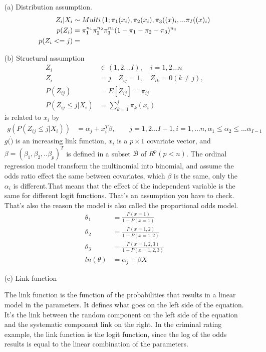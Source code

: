 \documentclass{article}
\begin{document}
\begin{itemize}
\item[(a)] Distribution assumption.
    \begin{align*}
 	Z_i| X_i & \sim Multi\left(1; \pi_1 (\mathnormal{x}_i), \pi_2(\mathnormal {x}_i), \pi_3(\mathnormal(x)_i,... \pi_I(\mathnormal(x)_i \right) \\
	p(Z_i) &= \pi_1^{n_1} \pi_2^{n_2} \pi_3^{n_3} (1-\pi_1 - \pi_2 - \pi_3)^{n_4}\\
          p(Z_i <= j) &= 
   \end{align*}  


\item[(b)] Structural assumption
    \begin{align*}
   Z_i & \in (1,2,.. I),\quad i = 1,2... n\\
  Z_i &= j \quad Z_{ij} = 1,  \quad Z_{ik} = 0 (k \neq j), \\
  P(Z_{ij}) &= E[Z_{ij}] = \pi_{ij}\\
    P(Z_{ij} \leq j | X_i) &= \sum_{k=1}^j \pi_k(x_i) 
\end{align*}
is related to $x_i$ by 
\begin{align*}
    g(P(Z_{ij} \leq j | X_i)) &= \alpha_j + x_i^T\beta, \qquad j=1,2...I-1, i=1,...n, \alpha_1 \leq \alpha_2 \leq ...\alpha_{I-1}
\end{align*}
$g(\dot)$ is an increasing link function, $x_i$ is a $p \times 1$ covariate vector, and $\beta = (\beta_1, \beta_2,.. \beta_p)^T$ is defined in a subset $\mathcal{B}$ of $R^p (p<n)$. 
The ordinal regression model transform the multinomial into binomial, and assume the odds ratio effect the same between covariates, which $\beta$ is the same, only the $\alpha_i$ is different.That means that the effect of the independent variable is the same for different logit functions. That’s an assumption you have to check. That’s also the reason the model is also called the proportional odds model.
\begin{align*}
   \theta_1 &= \frac{P(x=1)}{1-P(x=1)}\\
   \theta_2 &= \frac{P(x=1, 2)}{1-P(x=1,2)}\\
 \theta_3 &= \frac{P(x=1, 2,3)}{1-P(x=1,2,3)}\\
 ln(\theta) &= \alpha_j + \beta X
\end{align*}
\item[(c)] Link function

The link function is the function of the probabilities that results in a linear model in the parameters. It defines what goes on the left side of the equation. It’s the link between
the random component on the left side of the equation and the systematic component link on the right. In the criminal rating example, the link function is the logit function, since
the log of the odds results is equal to the linear combination of the parameters.


\end{itemize}
\end{document}
